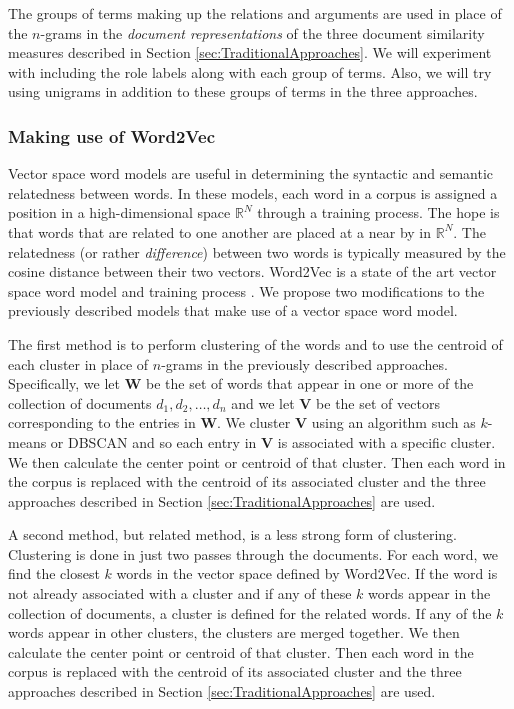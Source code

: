 \documentclass[11pt]{article}
\begin{document}
The groups of terms making up the relations and arguments are used in place of the $n$-grams in the \emph{document representations} of the three document similarity measures described in Section \ref{sec:TraditionalApproaches}. We will experiment with including the role labels along with each group of terms. Also, we will try using unigrams in addition to these groups of terms in the three approaches. 


\subsubsection{Making use of Word2Vec} \label{sec:Word2Vec}

Vector space word models are useful in determining the syntactic and semantic relatedness between words. In these models, each word in a corpus is assigned a position in a high-dimensional space $\mathbb{R}^N$ through a training process. The hope is that words that are related to one another are placed at a near by  in $\mathbb{R}^N$. The relatedness (or rather \emph{difference}) between two words is typically measured by the cosine distance between their two vectors. Word2Vec is a state of the art vector space word model and training process  \cite{Mikolov2013efficient}. We propose two modifications to the previously described models that make use of a vector space word model. 

The first method is to perform clustering of the words and to use the centroid of each cluster in place of $n$-grams in the previously described approaches. Specifically, we let $\mathbf{W}$ be the set of words that appear in one or more of the collection of documents $d_1, d_2, \dots, d_n$ and we let $\mathbf{V}$ be the set of vectors corresponding to the entries in $\mathbf{W}$. We cluster $\mathbf{V}$ using an algorithm such as $k$-means or DBSCAN and so each entry in $\mathbf{V}$ is associated with a specific cluster. We then calculate the center point or centroid of that cluster. Then each word in the corpus is replaced with the centroid of its associated cluster and the three approaches described in Section \ref{sec:TraditionalApproaches} are used. 

A second method, but related method, is a less strong form of clustering. Clustering is done in just two passes through the documents. For each word, we find the closest $k$ words in the vector space defined by Word2Vec. If the word is not already associated with a cluster and if any of these $k$ words appear in the collection of documents, a cluster is defined for the related words. If any of the $k$ words appear in other clusters, the clusters are merged together. We then calculate the center point or centroid of that cluster. Then each word in the corpus is replaced with the centroid of its associated cluster and the three approaches described in Section \ref{sec:TraditionalApproaches} are used. 
\end{document}
